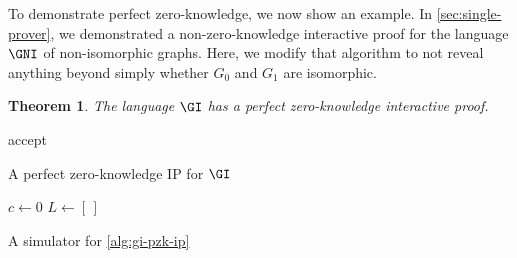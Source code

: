 \documentclass[english,12pt]{reedthesis}
\theoremstyle{plain}
\newtheorem{thm}{Theorem}[section]
\theoremstyle{definition}
\theoremstyle{remark}
\begin{document}
To demonstrate perfect zero-knowledge, we now show an example. In
\cref{sec:single-prover}, we demonstrated a non-zero-knowledge interactive proof
for the language $\GNI$ of non-isomorphic graphs. Here, we modify that algorithm
to not reveal anything beyond simply whether $G_{0}$ and $G_{1}$ are isomorphic.

\begin{thm}\label{thm:gi-pzk-ip}
  The language $\GI$ has a perfect zero-knowledge interactive proof.
\end{thm}

\begin{algorithm}[htbp]
  accept\;
  \caption{A perfect zero-knowledge IP for $\GI$}\label{alg:gi-pzk-ip}
\end{algorithm}

\begin{algorithm}[htbp]
  $c \leftarrow 0$\;
  $L \leftarrow [\,]$\;
  \KwRet{$\bot$}\;
  \caption{A simulator for \cref{alg:gi-pzk-ip}}\label{alg:gi-simulator}
\end{algorithm}
\end{document}
